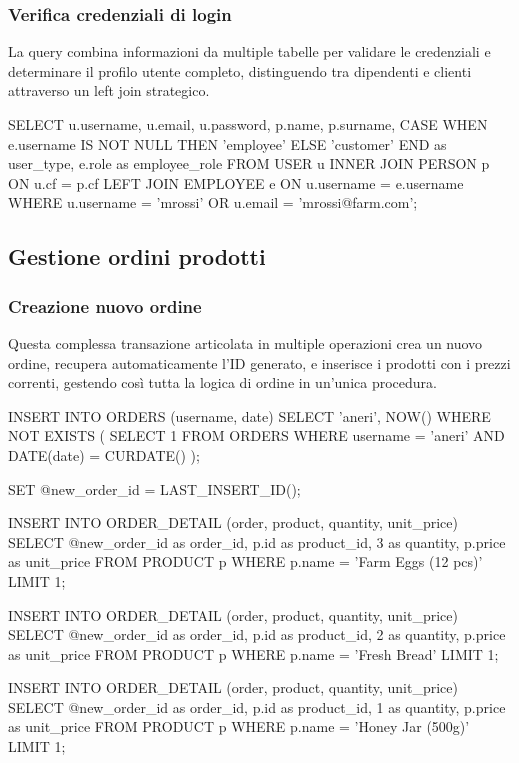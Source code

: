 \documentclass[a4paper,12pt]{report}
\begin{document}
\subsubsection{Verifica credenziali di login} 
La query combina informazioni da multiple tabelle per validare le credenziali e determinare il profilo utente completo, distinguendo tra dipendenti e clienti attraverso un left join strategico.

\begin{sqlcode}[caption={Query per verifica login}]
SELECT u.username, u.email, u.password, p.name, p.surname,
       CASE WHEN e.username IS NOT NULL THEN 'employee' ELSE 'customer' END as user_type,
       e.role as employee_role 
FROM USER u 
INNER JOIN PERSON p ON u.cf = p.cf 
LEFT JOIN EMPLOYEE e ON u.username = e.username 
WHERE u.username = 'mrossi' OR u.email = 'mrossi@farm.com';
\end{sqlcode}

\subsection{Gestione ordini prodotti} 

\subsubsection{Creazione nuovo ordine} 
Questa complessa transazione articolata in multiple operazioni crea un nuovo ordine, recupera automaticamente l'ID generato, e inserisce i prodotti con i prezzi correnti, gestendo così tutta la logica di ordine in un'unica procedura.

\begin{sqlcode}[caption={Query per creazione ordine}]
INSERT INTO ORDERS (username, date) 
SELECT 'aneri', NOW() 
WHERE NOT EXISTS (
  SELECT 1 
  FROM ORDERS 
  WHERE username = 'aneri' AND DATE(date) = CURDATE()
);

SET @new_order_id = LAST_INSERT_ID();

INSERT INTO ORDER_DETAIL (order, product, quantity, unit_price) 
SELECT @new_order_id as order_id, p.id as product_id, 3 as quantity, p.price as unit_price 
FROM PRODUCT p 
WHERE p.name = 'Farm Eggs (12 pcs)' 
LIMIT 1;

INSERT INTO ORDER_DETAIL (order, product, quantity, unit_price) 
SELECT @new_order_id as order_id, p.id as product_id, 2 as quantity, p.price as unit_price 
FROM PRODUCT p 
WHERE p.name = 'Fresh Bread' 
LIMIT 1;

INSERT INTO ORDER_DETAIL (order, product, quantity, unit_price) 
SELECT @new_order_id as order_id, p.id as product_id, 1 as quantity, p.price as unit_price 
FROM PRODUCT p 
WHERE p.name = 'Honey Jar (500g)' 
LIMIT 1;
\end{sqlcode}
\end{document}
